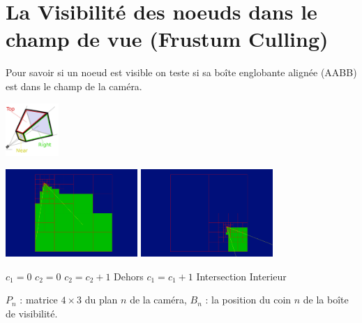 \documentclass{beamer}
\begin{document}
\section{La Visibilité des noeuds dans le champ de vue (Frustum Culling)}
\begin{frame}
    Pour savoir si un noeud est visible on teste si sa boîte englobante alignée (AABB) est dans le champ de la caméra.
    \begin{center}
      \includegraphics[width=2cm]{frustum_culling_cone.png}
    \end{center}
    \begin{center}
      \includegraphics[width=5cm]{terrain_culling_0.png}
      \includegraphics[width=5cm]{terrain_culling_1.png}
    \end{center}   
\end{frame}

\begin{frame}
  \begin{multicols}{2}
    \begin{algorithmic}[1]
      \STATE $c_1 = 0$
	\STATE $c_2 = 0$
	    \STATE $c_2 = c_2 + 1$
	  \ENDIF
	\ENDFOR
	  \RETURN Dehors
	\ELSE
	  \STATE $c_1 = c_1 + 1$
	\ENDIF
      \ENDFOR
	\RETURN Intersection
      \ELSE
	\RETURN Interieur
      \ENDIF
    \end{algorithmic}
  \end{multicols}
  $P_n$ : matrice $4 \times 3$ du plan $n$ de la caméra, $B_n$ : la position du coin $n$ de la boîte de visibilité.
\end{frame}
\end{document}
